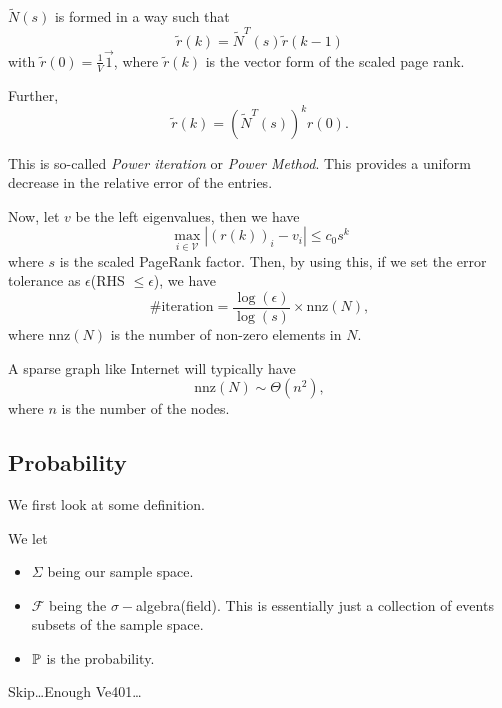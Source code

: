 \begin{answer}
	\(\widetilde{N}(s)\) is formed in a way such that
	\[
		\widetilde{r}(k) = \widetilde{N}^{T}(s)\widetilde{r}(k - 1)
	\]
	with \(\widetilde{r}(0) = \frac{1}{V}\vec{1}\), where \(\widetilde{r}(k)\) is the vector form of the scaled page rank.

	Further,
	\[
		\widetilde{r}(k) = \left(\widetilde{N}^{T}(s)\right)^k r(0).
	\]

	This is so-called \emph{Power iteration} or \emph{Power Method}. This provides a uniform decrease in the relative error of the entries.

	Now, let \(v\) be the left eigenvalues, then we have
	\[
		\max_{i\in \mathcal{V}}\left\vert (r(k))_i - v_i\right\vert \leq c_0 s^k
	\]
	where \(s\) is the scaled PageRank factor. Then, by using this, if we set the error tolerance as \(\epsilon\)(RHS \(\leq \epsilon\)), we have
	\[
		\#\text{iteration} = \frac{\log(\epsilon)}{\log(s)}\times \mathrm{nnz}(N),
	\]
	where \(\mathrm{nnz}(N)\) is the number of non-zero elements in \(N\).
	\begin{remark}
		A sparse graph like Internet will typically have
		\[
			\mathrm{nnz}(N)\sim\Theta(n^2),
		\]
		where \(n\) is the number of the nodes.
	\end{remark}
\end{answer}


\subsection{Probability}
We first look at some definition.
\begin{definition}
	We let
	\begin{itemize}
		\item \(\Sigma\) being our sample space.
		\item \(\mathcal{F}\) being the \(\sigma-\)algebra(field). This is essentially just a collection of events subsets of the sample space.
		\item \(\mathbb{\MakeUppercase{P}}\) is the probability.
	\end{itemize}
\end{definition}

\begin{eg}
	Skip\ldots Enough Ve401\ldots
\end{eg}

